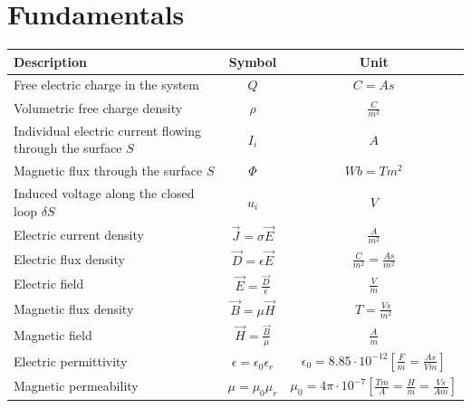 \section{Fundamentals}

\begin{tabular}{|l|c|c|}
\hline \textbf{Description} & \textbf{Symbol} & \textbf{Unit} \\ 
\hline Free electric charge in the system & $Q$ & $C = As$ \\
\hline Volumetric free charge density & $\rho$ & $\frac{C}{m^3}$ \\
\hline Individual electric current flowing through the surface $S$ & $I_i$ & $A$ \\
\hline Magnetic flux through the surface $S$ & $\Phi$	& $Wb = Tm^2$\\
\hline Induced voltage along the closed loop $\delta S$ & $u_i$ & $V$ \\
\hline Electric current density & $\vec{J} = \sigma \vec{E}$ & $\frac{A}{m^2}$\\
\hline Electric flux density & $\vec{D} = \epsilon \vec{E}$ & $\frac{C}{m^2} = \frac{As}{m^2}$\\
\hline Electric field & $\vec{E} = \frac{\vec{D}}{\epsilon}$ & $\frac{V}{m}$\\
\hline Magnetic flux density & $\vec{B} = \mu \vec{H}$ & $T = \frac{Vs}{m^2}$\\
\hline Magnetic field & $\vec{H} = \frac{\vec{B}}{\mu}$ & $\frac{A}{m}$\\
\hline Electric permittivity & $\epsilon = \epsilon_0 \epsilon_r$ & $\epsilon_0 = 8.85 \cdot 10^{-12} \left[\frac{F}{m} = \frac{As}{Vm}\right]$\\
\hline Magnetic permeability & $\mu = \mu_0 \mu_r$ & $\mu_0 = 4\pi \cdot 10^{-7} \left[\frac{Tm}{A} = \frac{H}{m} = \frac{Vs}{Am}\right]$ \\
\hline 
\end{tabular} 

